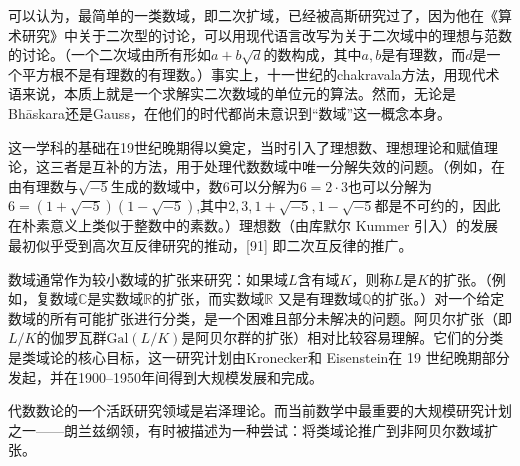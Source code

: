 可以认为，最简单的一类数域，即二次扩域，已经被高斯研究过了，因为他在《算术研究》中关于二次型的讨论，可以用现代语言改写为关于二次域中的理想与范数的讨论。（一个二次域由所有形如$a+b\sqrt{d}$的数构成，其中$a, b$是有理数，而$d$是一个平方根不是有理数的有理数。）事实上，十一世纪的chakravala方法，用现代术语来说，本质上就是一个求解实二次数域的单位元的算法。然而，无论是Bhāskara还是Gauss，在他们的时代都尚未意识到“数域”这一概念本身。

这一学科的基础在19世纪晚期得以奠定，当时引入了理想数、理想理论和赋值理论，这三者是互补的方法，用于处理代数数域中唯一分解失效的问题。（例如，在由有理数与$\sqrt{-5}$生成的数域中，数$6$可以分解为$6 = 2 \cdot 3$也可以分解为$6 = (1+\sqrt{-5})(1-\sqrt{-5})$,其中$2, 3, 1+\sqrt{-5}, 1-\sqrt{-5}$都是不可约的，因此在朴素意义上类似于整数中的素数。）理想数（由库默尔 Kummer 引入）的发展最初似乎受到高次互反律研究的推动，[91] 即二次互反律的推广。

数域通常作为较小数域的扩张来研究：如果域$L$含有域$K$，则称$L$是$K$的扩张。（例如，复数域$\mathbb{C}$是实数域$\mathbb{R}$的扩张，而实数域$\mathbb{R}$ 又是有理数域$\mathbb{Q}$的扩张。）对一个给定数域的所有可能扩张进行分类，是一个困难且部分未解决的问题。阿贝尔扩张（即$L/K$的伽罗瓦群$\mathrm{Gal}(L/K)$是阿贝尔群的扩张）相对比较容易理解。它们的分类是类域论的核心目标，这一研究计划由Kronecker和 Eisenstein在 19 世纪晚期部分发起，并在1900–1950年间得到大规模发展和完成。

代数数论的一个活跃研究领域是岩泽理论。而当前数学中最重要的大规模研究计划之一——朗兰兹纲领，有时被描述为一种尝试：将类域论推广到非阿贝尔数域扩张。

